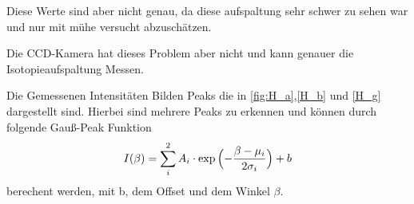 Diese Werte sind aber nicht genau, da diese aufspaltung sehr schwer zu sehen war und nur mit mühe versucht abzuschätzen.

Die CCD-Kamera hat dieses Problem aber nicht und kann genauer die Isotopieaufspaltung Messen.

Die Gemessenen Intensitäten Bilden Peaks die in \cref{fig:H_a},\ref{H_b} und \ref{H_g} dargestellt sind. 
Hierbei sind mehrere Peaks zu erkennen und können durch folgende Gauß-Peak Funktion 
\begin{equation}
    I(\beta) = \sum_i^2 A_i \cdot \exp{\Bigl(-\frac{\beta-\mu_i}{2\sigma_i}}\Bigr) +b
\end{equation}
berechent werden, mit b, dem Offset und dem Winkel $\beta$. 
